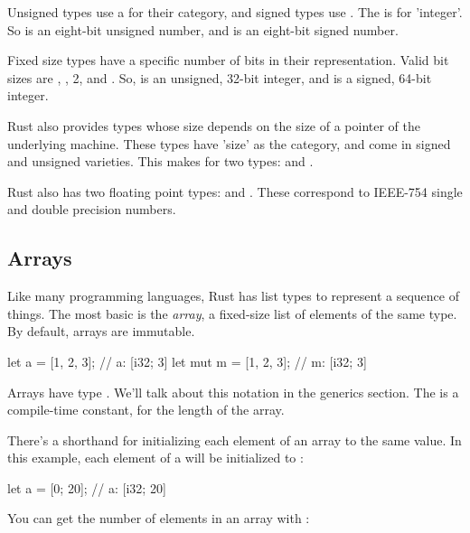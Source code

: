 \blank

Unsigned types use a  for their category, and signed types use . The  is for 'integer'. So  is an 
eight-bit unsigned number, and  is an eight-bit signed number.


Fixed size types have a specific number of bits in their representation. Valid bit sizes are , , 2, and .
So,  is an unsigned, 32-bit integer, and  is a signed, 64-bit integer.


Rust also provides types whose size depends on the size of a pointer of the underlying machine. These types have 'size' as the category,
and come in signed and unsigned varieties. This makes for two types:  and .


Rust also has two floating point types:  and . These correspond to IEEE-754 single and double precision numbers.

\subsection*{Arrays}

Like many programming languages, Rust has list types to represent a sequence of things. The most basic is the \emph{array}, a 
fixed-size list of elements of the same type. By default, arrays are immutable.

\begin{rustc}
let a = [1, 2, 3]; // a: [i32; 3]
let mut m = [1, 2, 3]; // m: [i32; 3]
\end{rustc}

Arrays have type \code{[T; N]}. We'll talk about this  notation in the generics section. The  is a compile-time 
constant, for the length of the array.

\blank

There's a shorthand for initializing each element of an array to the same value. In this example, each element of a will be initialized 
to :

\begin{rustc}
let a = [0; 20]; // a: [i32; 20]
\end{rustc}

You can get the number of elements in an array  with :

